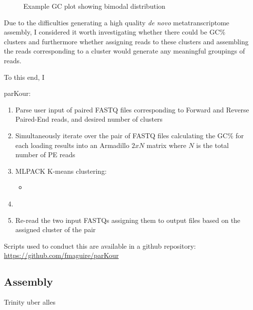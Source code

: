 \begin{figure}
    Example GC plot showing bimodal distribution
\end{figure}

Due to the difficulties generating a high quality \textit{de novo} metatranscriptome assembly, I considered  it worth investigating whether there could be GC\%
clusters and furthermore whether assigning reads to these clusters and assembling the reads corresponding to a cluster would generate any meaningful groupings of reads.

To this end, I 

parKour:
\begin{enumerate}
    \item Parse user input of paired FASTQ files corresponding to Forward and Reverse Paired-End reads, and desired number of clusters
    \item Simultaneously iterate over the pair of FASTQ files calculating the GC\% for each loading results into an Armadillo \(2xN\) matrix where \(N\) is the total number of PE reads
    \item MLPACK K-means clustering:
        \begin{itemize}
            \item \
        \end{itemize}
    \item 
    \item Re-read the two input FASTQs assigning them to output files based on the assigned cluster of the pair
\end{enumerate}



Scripts used to conduct this are available in a github repository:
\url{https://github.com/fmaguire/parKour}



\subsection{Assembly}

Trinity uber alles



